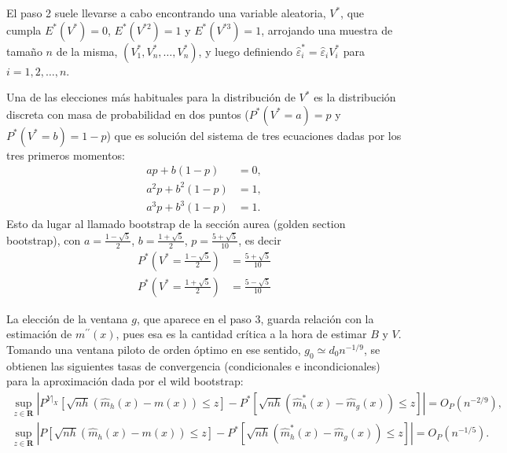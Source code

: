\documentclass[]{book}
\theoremstyle{definition}
\theoremstyle{definition}
\theoremstyle{definition}
\theoremstyle{remark}
\begin{document}
El paso 2 suele llevarse a cabo encontrando una variable aleatoria,
\(V^{\ast}\), que cumpla \(E^{\ast}\left( V^{\ast} \right) =0\),
\(E^{\ast}\left( V^{\ast 2} \right) =1\) y
\(E^{\ast}\left( V^{\ast 3} \right) =1\), arrojando una muestra de
tamaño \(n\) de la misma,
\(\left( V_1^{\ast},V_n^{\ast},\ldots ,V_n^{\ast} \right)\), y luego
definiendo \(\hat{\varepsilon}_i^{\ast}=\hat{\varepsilon}_iV_i^{\ast}\)
para \(i=1, 2, \ldots, n\).

Una de las elecciones más habituales para la distribución de
\(V^{\ast}\) es la distribución discreta con masa de probabilidad en dos
puntos (\(P^{\ast}\left( V^{\ast}=a \right) =p\) y
\(P^{\ast}\left( V^{\ast}=b \right) =1-p\)) que es solución del sistema
de tres ecuaciones dadas por los tres primeros momentos:
\[\begin{aligned}
ap+b\left( 1-p \right) &= 0, \\
a^2p+b^2\left( 1-p \right) &= 1, \\
a^{3}p+b^{3}\left( 1-p \right) &= 1.
\end{aligned}\] Esto da lugar al llamado bootstrap de la sección aurea
(golden section bootstrap), con \(a=\frac{1-\sqrt{5}}{2}\),
\(b=\frac{1+\sqrt{5}}{2}\), \(p=\frac{ 5+\sqrt{5}}{10}\), es decir
\[\begin{aligned}
P^{\ast}\left( V^{\ast}=\frac{1-\sqrt{5}}{2} \right) &= \frac{5+\sqrt{5}}{10} \\
P^{\ast}\left( V^{\ast}=\frac{1+\sqrt{5}}{2} \right) &= \frac{5-\sqrt{5}}{10}
\end{aligned}\]

La elección de la ventana \(g\), que aparece en el paso 3, guarda
relación con la estimación de \(m^{\prime \prime }\left( x \right)\),
pues esa es la cantidad crítica a la hora de estimar \(B\) y \(V\).
Tomando una ventana piloto de orden óptimo en ese sentido,
\(g_{0}\simeq d_{0}n^{-1/9}\), se obtienen las siguientes tasas de
convergencia (condicionales e incondicionales) para la aproximación dada
por el wild bootstrap: \[\begin{gathered}
\sup_{z\in \boldsymbol{R}} \left\vert P^{\left. Y\right\vert _{X}}\left[ 
\sqrt{nh}\left( \hat{m}_{h}\left( x \right) -m\left( x \right) \right) \leq z
\right] - P^{\ast}\left[ \sqrt{nh}\left( \hat{m}_{h}^{\ast}\left( x \right) -
\hat{m}_{g}\left( x \right) \right) \leq z\right] \right\vert = O_{P}\left( n^{-2/9} \right), 
\\
\sup_{z\in \boldsymbol{R}} \left\vert P\left[ \sqrt{nh}\left( \hat{m}
_{h}\left( x \right) -m\left( x \right) \right) \leq z\right] 
 - P^{\ast}\left[ \sqrt{nh}\left( \hat{m}_{h}^{\ast}\left( x \right) -\hat{m}_{g}\left(
x \right) \right) \leq z\right] \right\vert = O_{P}\left( n^{-1/5} \right).
\end{gathered}\]
\end{document}
